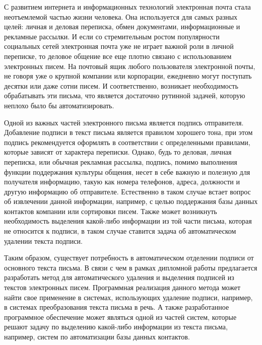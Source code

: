 \Introduction
С развитием интернета и информационных технологий электронная почта стала неотъемлемой частью жизни человека. Она используется для самых разных целей: личная и деловая переписка, обмен документами, информационные и рекламные рассылки. И если со стремительным ростом популярности социальных сетей электронная почта уже не играет важной роли в личной переписке, то деловое общение все еще плотно связано с использованием электронных писем. На почтовый ящик любого пользователя электронной почты, не говоря уже о крупной компании или корпорации, ежедневно могут поступать десятки или даже сотни писем. И соответственно, возникает необходимость обрабатывать эти письма, что является достаточно рутинной задачей, которую неплохо было бы автоматизировать.

Одной из важных частей электронного письма является подпись отправителя. Добавление подписи в текст письма является правилом хорошего тона, при этом подпись рекомендуется оформлять в соответствии с определенными правилами, которые зависят от характера переписки. Однако, будь то деловая, личная переписка, или обычная рекламная рассылка, подпись, помимо выполнения функции поддержания культуры общения, несет в себе важную и полезную для получателя информацию, такую как номера телефонов, адреса, должности и другую информацию об отправителе. Естественно в таком случае встает вопрос об извлечении данной информации, например, с целью поддержания базы данных контактов компании или сортировки писем. Также может возникнуть необходимость выделения какой-либо информации из той части письма, которая не относится к подписи, в таком случае ставится задача об автоматическом удалении текста подписи.  

Таким образом, существует потребность в автоматическом отделении подписи от основного текста письма. В связи с чем в рамках дипломной работы предлагается разработать метод для автоматического удаления и выделения подписей из текстов электронных писем. Программная реализация данного метода может найти свое применение в системах, использующих удаление подписи, например, в системах преобразования текста письма в речь. А также разработанное программное обеспечение может являться одной из частей систем, которые решают задачу по выделению какой-либо информации из текста письма, например, систем по автоматизации базы данных контактов.